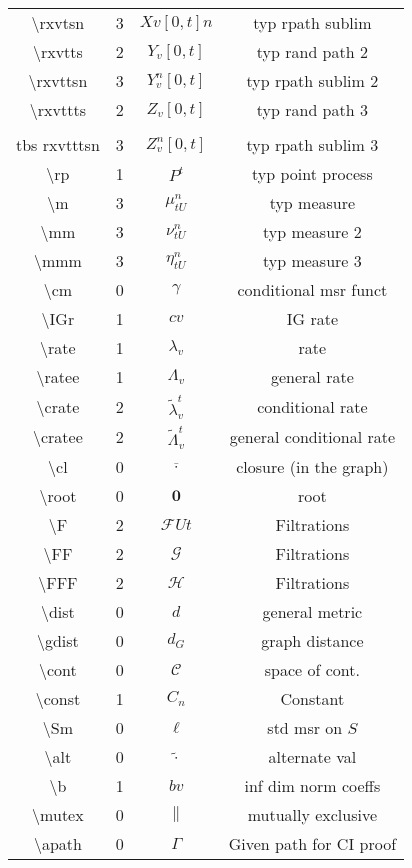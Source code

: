 \documentclass[12pt]{article}
\newcommand{\mc}{\mathcal}
\newcommand{\ov}{\overline}
\newcommand{\tbs}{\textbackslash}
\renewcommand{\root}{\mathbf{0}}				%
\renewcommand{\v}{v}							%
\renewcommand{\U}{U}							%
\renewcommand{\S}{S}							%
\renewcommand{\b}{b}							%
\renewcommand{\t}{t}							%
\newcommand{\F}{\mc{F}}							%
\newcommand{\FG}[2]{\mc{G}}						%
\newcommand{\FH}[2]{\mc{H}}						%
\newcommand{\X}{X}								%
\newcommand{\IGr}{c}							%
\newcommand{\cl}{\ov}							%
\newcommand{\numb}{n}								%
\newcommand{\rxvtts}[2]{Y_{#1}{#2}}					%
\newcommand{\rxvttsn}[3]{Y_{#1}^{#3}{#2}}			%
\newcommand{\rxvttts}[2]{Z_{#1}{#2}}				%
\newcommand{\rxvtttsn}[3]{Z_{#1}^{#3}{#2}}			%
\newcommand{\rp}[1]{P^{#1}}							%
\newcommand{\m}[3]{\mu_{#2#1}^{#3}}						%
\newcommand{\mm}[3]{\nu_{#2#1}^{#3}}						%
\newcommand{\mmm}[3]{\eta_{#2#1}^{#3}}						%
\newcommand{\cm}{\gamma}							%
\newcommand{\rate}[1]{\lambda_{#1}}					%
\newcommand{\ratee}[1]{\Lambda_{#1}}				%
\newcommand{\crate}[2]{\alt{\lambda}_{#1}^{#2}}		%
\newcommand{\cratee}[2]{\alt{\Lambda}_{#1}^{#2}} 	%
\newcommand{\dist}{d}								%
\newcommand{\gdist}{d_G}							%
\newcommand{\cont}{\mc{C}}							%
\newcommand{\const}[1]{C_{#1}}						%
\newcommand{\Sm}{\ell}								%
\newcommand{\alt}{\widetilde}						%
\newcommand{\mutex}{\|}								%
\newcommand{\apath}{\Gamma}						%
\begin{document}
\begin{longtable}{c|c|c|c}
\tbs rxvtsn&3&\(\X{\v}{[0,\t]}{\numb}\)	&typ rpath sublim\\
\tbs rxvtts&2&\(\rxvtts{\v}{[0,\t]}\)					&typ rand path 2\\
\tbs rxvttsn&3&\(\rxvttsn{\v}{[0,\t]}{\numb}\)	&typ rpath sublim 2\\
\tbs rxvttts&2&\(\rxvttts{\v}{[0,\t]}\)				&typ rand path 3\\\\tbs rxvtttsn&3&\(\rxvtttsn{\v}{[0,\t]}{\numb}\)	&typ rpath sublim 3\\
\tbs rp&1& \(\rp{\t}\)						&typ point process\\
\tbs m&3&\(\m{\U}{\t}{\numb}\)						&typ measure\\
\tbs mm&3&\(\mm{\U}{\t}{\numb}\)						&typ measure 2\\
\tbs mmm&3&\(\mmm{\U}{\t}{\numb}\)						&typ measure 3\\
\tbs cm&0&\(\cm\)							&conditional msr funct\\
\tbs IGr&1&\(\IGr{\v}\)						&IG rate\\
\tbs rate&1&\(\rate{\v}\)					&rate\\
\tbs ratee&1&\(\ratee{\v}\)					&general rate\\
\tbs crate&2&\(\crate{\v}{\t}\)		&conditional rate\\
\tbs cratee&2&\(\cratee{\v}{\t}\)		&general conditional rate\\
\tbs cl&0&\(\cl{\cdot}\)			&closure (in the graph)\\
\tbs root&0&\(\root\)				&root\\
\tbs F&2&\(\F{\U}{\t}\)&Filtrations\\
\tbs FF&2&\(\FG{\U}{\t}\)&Filtrations\\
\tbs FFF&2&\(\FH{\U}{\t}\)&Filtrations\\
\tbs dist&0& \(\dist\)				&general metric\\
\tbs gdist &0& \(\gdist\)			&graph distance\\
\tbs cont &0& \(\cont\)				&space of cont. \\
\tbs const &1& \(\const{\numb}\)	&Constant\\
\tbs Sm&0&\(\Sm\)							&std msr on \(\S\)\\
\tbs alt&0&\(\widetilde{\cdot}\)			&alternate val\\
\tbs b&1& \(\b{\v}\)						&inf dim norm coeffs\\
\tbs mutex&0&\(\mutex\)						&mutually exclusive\\
\tbs apath&0&\(\apath\)						&Given path for CI proof\\

\end{longtable}
\end{document}
